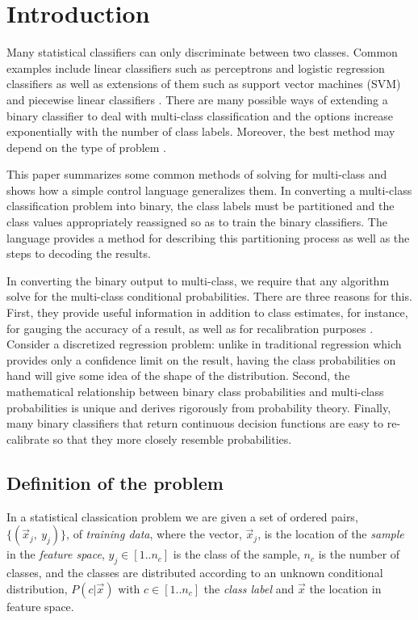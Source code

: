 \section{Introduction}

Many statistical classifiers can only discriminate between two classes.
Common examples include linear classifiers such as perceptrons and
logistic regression classifiers \citep{Michie_etal1994} as well as extensions
of them such as support vector machines (SVM) \citep{Mueller_etal2001} and 
piecewise linear classifiers \citep{Bagirov2005,Mills2018}.
There are many possible ways of extending a binary classifier to deal
with multi-class classification and the options increase exponentially
with the number of class labels.
Moreover, the best method may depend on the type of problem
\citep{Dietterich_Bakiri1995,Allwein_etal2000}.

This paper summarizes some common methods of solving for 
multi-class and shows how a simple control language generalizes them.
In converting a multi-class classification problem into binary,
the class labels must be partitioned
and the class values appropriately reassigned
so as to train the binary classifiers.
The language provides a method for describing this partitioning process
as well as the steps to decoding the results.

In converting the binary output to multi-class,
we require that any algorithm solve 
for the multi-class conditional probabilities.
There are three reasons for this.
First, they provide useful information
in addition to class estimates,
for instance, for gauging the accuracy of a result, as well as for recalibration
purposes \citep{Mills2009}.
Consider a discretized regression problem: unlike in traditional regression
which provides only a confidence limit on the result,
having the class probabilities on hand will give some idea of the
shape of the distribution.
Second, the mathematical relationship between binary class
probabilities and multi-class probabilities is unique and
derives rigorously from probability theory.
Finally, many binary classifiers that return continuous decision functions
are easy to re-calibrate so that they more closely resemble probabilities.

\subsection{Definition of the problem}

\label{description}

In a statistical classication problem we are given a set of ordered pairs, 
$\lbrace (\vec x_j,~ y_j) \rbrace$, of {\it training data},
where the vector, $\vec x_j$, is the location of the {\it sample} in 
the {\it feature space},
$y_j \in [1..n_c]$ is the class of the sample,
$n_c$ is the number of classes,
and the classes are
distributed according to an unknown conditional distribution,
$P(c | \vec x)$ with $c \in [1..n_c]$ the {\it class label} and $\vec x$ the location
in feature space.

